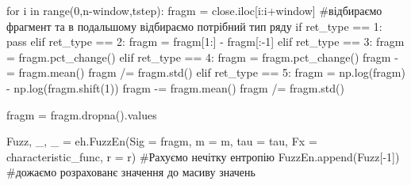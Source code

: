 \documentclass[
  letterpaper,
]{report}
\newenvironment{Shaded}{\begin{snugshade}}{\end{snugshade}}
\newcommand{\BuiltInTok}[1]{\textcolor[rgb]{0.00,0.23,0.31}{#1}}
\newcommand{\CommentTok}[1]{\textcolor[rgb]{0.37,0.37,0.37}{#1}}
\newcommand{\ControlFlowTok}[1]{\textcolor[rgb]{0.00,0.23,0.31}{#1}}
\newcommand{\DecValTok}[1]{\textcolor[rgb]{0.68,0.00,0.00}{#1}}
\newcommand{\KeywordTok}[1]{\textcolor[rgb]{0.00,0.23,0.31}{#1}}
\newcommand{\NormalTok}[1]{\textcolor[rgb]{0.00,0.23,0.31}{#1}}
\newcommand{\OperatorTok}[1]{\textcolor[rgb]{0.37,0.37,0.37}{#1}}
\begin{document}
\begin{Shaded}
\begin{Highlighting}[]
\ControlFlowTok{for}\NormalTok{ i }\KeywordTok{in} \BuiltInTok{range}\NormalTok{(}\DecValTok{0}\NormalTok{,n}\OperatorTok{{-}}\NormalTok{window,tstep):}
\NormalTok{    fragm }\OperatorTok{=}\NormalTok{ close.iloc[i:i}\OperatorTok{+}\NormalTok{window] }\CommentTok{\#відбираємо фрагмент та в подальшому відбираємо потрібний тип ряду}
    \ControlFlowTok{if}\NormalTok{ ret\_type }\OperatorTok{==} \DecValTok{1}\NormalTok{: }
        \ControlFlowTok{pass}
    \ControlFlowTok{elif}\NormalTok{ ret\_type }\OperatorTok{==} \DecValTok{2}\NormalTok{:}
\NormalTok{        fragm }\OperatorTok{=}\NormalTok{ fragm[}\DecValTok{1}\NormalTok{:] }\OperatorTok{{-}}\NormalTok{ fragm[:}\OperatorTok{{-}}\DecValTok{1}\NormalTok{]}
    \ControlFlowTok{elif}\NormalTok{ ret\_type }\OperatorTok{==} \DecValTok{3}\NormalTok{:}
\NormalTok{        fragm }\OperatorTok{=}\NormalTok{ fragm.pct\_change()}
    \ControlFlowTok{elif}\NormalTok{ ret\_type }\OperatorTok{==} \DecValTok{4}\NormalTok{:}
\NormalTok{        fragm }\OperatorTok{=}\NormalTok{ fragm.pct\_change()}
\NormalTok{        fragm }\OperatorTok{{-}=}\NormalTok{ fragm.mean()}
\NormalTok{        fragm }\OperatorTok{/=}\NormalTok{ fragm.std()}
    \ControlFlowTok{elif}\NormalTok{ ret\_type }\OperatorTok{==} \DecValTok{5}\NormalTok{:}
\NormalTok{        fragm }\OperatorTok{=}\NormalTok{ np.log(fragm) }\OperatorTok{{-}}\NormalTok{ np.log(fragm.shift(}\DecValTok{1}\NormalTok{))}
\NormalTok{        fragm }\OperatorTok{{-}=}\NormalTok{ fragm.mean()}
\NormalTok{        fragm }\OperatorTok{/=}\NormalTok{ fragm.std()}
        
\NormalTok{    fragm }\OperatorTok{=}\NormalTok{ fragm.dropna().values}
    
\NormalTok{    Fuzz, \_, \_ }\OperatorTok{=}\NormalTok{ eh.FuzzEn(Sig }\OperatorTok{=}\NormalTok{ fragm, m }\OperatorTok{=}\NormalTok{ m, tau }\OperatorTok{=}\NormalTok{ tau, Fx }\OperatorTok{=}\NormalTok{ characteristic\_func, r }\OperatorTok{=}\NormalTok{ r) }\CommentTok{\#Рахуємо нечітку ентропію }
\NormalTok{    FuzzEn.append(Fuzz[}\OperatorTok{{-}}\DecValTok{1}\NormalTok{]) }\CommentTok{\#дожаємо розрахованє значення до масиву значень }
\end{Highlighting}
\end{Shaded}
\end{document}
